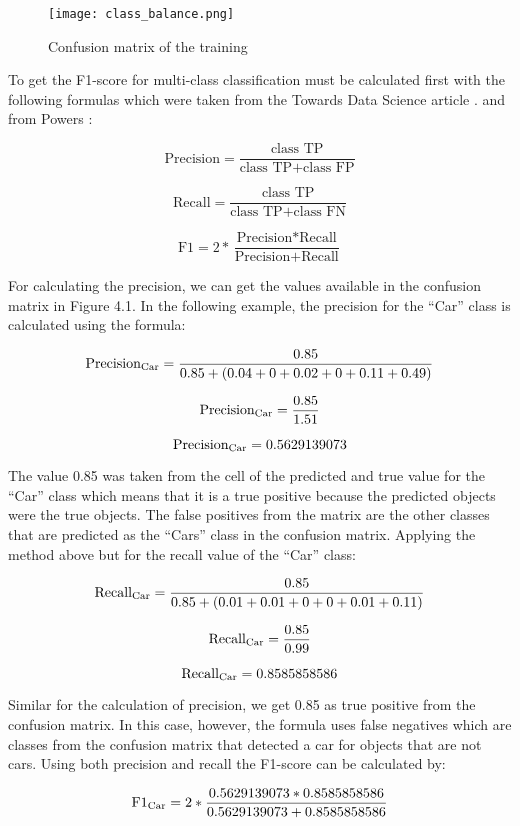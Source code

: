 \begin{figure}[h!]
	\texttt{[image: class\_balance.png]}
	\caption{Confusion matrix of the training}
	\label{fig:class_bal}
\end{figure}


To get the F1-score for multi-class classification must be calculated first with the following formulas which were taken from the Towards Data Science article \cite{Korstanje_2021}. and from Powers \citeyear{D_Powers}:


\[{\text{Precision}}= \frac{\text{class TP}}{\text{class TP}+\text{class FP}} \]

\[{\text{Recall}}= \frac{\text{class TP}}{\text{class TP}+\text{class FN}} \]

\[{\text{F1}}= 2 * \frac{\text{Precision}*\text{Recall}}{\text{Precision}+\text{Recall}} \]

For calculating the precision, we can get the values available in the confusion matrix in Figure 4.1. In the following example, the precision for the “Car” class is calculated using the formula:

\[{\text{Precision\textsubscript{Car}}}= \frac{0.85}{0.85+(0.04+0+0.02+0+0.11+0.49)} \]

\[{\text{Precision\textsubscript{Car}}}= \frac{0.85}{1.51} \]

\[{\text{Precision\textsubscript{Car}}}= 0.5629139073 \]

The value 0.85 was taken from the cell of the predicted and true value for the “Car” class which means that it is a true positive because the predicted objects were the true objects. The false positives from the matrix are the other classes that are predicted as the “Cars” class in the confusion matrix. Applying the method above but for the recall value of the “Car” class:


\[{\text{Recall\textsubscript{Car}}}= \frac{0.85}{0.85+(0.01+0.01+0+0+0.01+0.11)} \]

\[{\text{Recall\textsubscript{Car}}}= \frac{0.85}{0.99} \]

\[{\text{Recall\textsubscript{Car}}}= 0.8585858586 \]

Similar for the calculation of precision, we get 0.85 as true positive from the confusion matrix. In this case, however, the formula uses false negatives which are classes from the confusion matrix that detected a car for objects that are not cars. Using both precision and recall the F1-score can be calculated by:

\[{\text{F1}\textsubscript{Car}}= 2 * \frac{0.5629139073*0.8585858586}{0.5629139073+0.8585858586} \]

